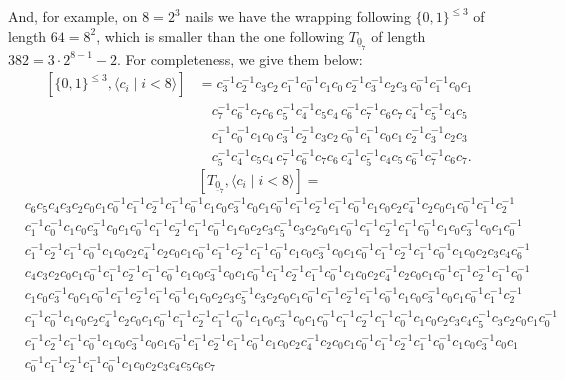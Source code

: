 \documentclass[11pt, a4paper, oneside]{article}
\theoremstyle{remark}
\theoremstyle{lemma}
\begin{document}
And, for example, on \(8 = 2^3\) nails we have the wrapping following \(\{0,1\}^{\leq 3}\) of length \(64 = 8^2\), which is smaller than the one following \(T_{\underline{0}_{7}}\) of length \( 382 = 3 \cdot 2^{8-1} - 2\). For completeness, we give them below:
\begin{align*}
\left[ \{0,1\}^{\leq 3}, \langle c_i \mid i < 8 \rangle \right] 
&= c_3^{-1}c_2^{-1}c_3c_2 \, c_1^{-1}c_0^{-1}c_1c_0 \, c_2^{-1}c_3^{-1}c_2c_3 \, c_0^{-1}c_1^{-1}c_0c_1 \, \\
&\quad
c_7^{-1}c_6^{-1}c_7c_6 \, c_5^{-1}c_4^{-1}c_5c_4 \, c_6^{-1}c_7^{-1}c_6c_7 \, c_4^{-1}c_5^{-1}c_4c_5 \, \\
&\quad c_1^{-1}c_0^{-1}c_1c_0 \, c_3^{-1}c_2^{-1}c_3c_2 \, c_0^{-1}c_1^{-1}c_0c_1 \, c_2^{-1}c_3^{-1}c_2c_3 \, \\
&\quad c_5^{-1}c_4^{-1}c_5c_4 \, c_7^{-1}c_6^{-1}c_7c_6 \, c_4^{-1}c_5^{-1}c_4c_5 \, c_6^{-1}c_7^{-1}c_6c_7.
\end{align*}
\[
\left[ T_{\underline{0}_7}, \langle c_i \mid i < 8 \rangle \right] =
\]
\[
\begin{aligned}
&c_6 c_5 c_4 c_3 c_2 c_0 c_1 c_0^{-1} c_1^{-1} c_2^{-1} c_1^{-1} c_0^{-1} c_1 c_0 c_3^{-1} c_0 c_1 c_0^{-1} c_1^{-1} c_2^{-1} c_1^{-1} c_0^{-1} c_1 c_0 c_2 c_4^{-1} c_2 c_0 c_1 c_0^{-1} c_1^{-1} c_2^{-1}\\ 
& c_1^{-1} c_0^{-1} c_1 c_0 c_3^{-1} c_0 c_1 c_0^{-1} c_1^{-1} c_2^{-1} c_1^{-1} c_0^{-1} c_1 c_0 c_2 c_3 c_5^{-1} c_3 c_2 c_0 c_1 c_0^{-1} c_1^{-1} c_2^{-1} c_1^{-1} c_0^{-1} c_1 c_0 c_3^{-1} c_0 c_1 c_0^{-1}\\
&c_1^{-1} c_2^{-1} c_1^{-1} c_0^{-1} c_1 c_0 c_2 c_4^{-1} c_2 c_0 c_1 c_0^{-1} c_1^{-1} c_2^{-1} c_1^{-1} c_0^{-1} c_1 c_0 c_3^{-1} c_0 c_1 c_0^{-1} c_1^{-1} c_2^{-1} c_1^{-1} c_0^{-1} c_1 c_0 c_2 c_3 c_4 c_6^{-1}\\
&c_4 c_3 c_2 c_0 c_1 c_0^{-1} c_1^{-1} c_2^{-1} c_1^{-1} c_0^{-1}c_1 c_0 c_3^{-1} c_0 c_1 c_0^{-1} c_1^{-1} c_2^{-1} c_1^{-1} c_0^{-1} c_1 c_0 c_2 c_4^{-1} c_2 c_0 c_1 c_0^{-1} c_1^{-1} c_2^{-1} c_1^{-1} c_0^{-1}\\
&c_1 c_0 c_3^{-1} c_0 c_1 c_0^{-1} c_1^{-1} c_2^{-1} c_1^{-1} c_0^{-1} c_1 c_0 c_2 c_3 c_5^{-1} c_3 c_2 c_0 c_1 c_0^{-1} c_1^{-1} c_2^{-1} c_1^{-1} c_0^{-1} c_1 c_0 c_3^{-1} c_0 c_1 c_0^{-1}c_1^{-1} c_2^{-1}\\
&c_1^{-1} c_0^{-1} c_1 c_0 c_2 c_4^{-1} c_2 c_0 c_1 c_0^{-1} c_1^{-1} c_2^{-1} c_1^{-1} c_0^{-1} c_1 c_0c_3^{-1} c_0 c_1 c_0^{-1} c_1^{-1} c_2^{-1} c_1^{-1} c_0^{-1} c_1 c_0 c_2 c_3c_4 c_5^{-1} c_3 c_2 c_0c_1 c_0^{-1}\\
&c_1^{-1} c_2^{-1} c_1^{-1} c_0^{-1} c_1 c_0 c_3^{-1} c_0 c_1 c_0^{-1} c_1^{-1} c_2^{-1} c_1^{-1} c_0^{-1} c_1 c_0 c_2 c_4^{-1} c_2 c_0 c_1 c_0^{-1}c_1^{-1} c_2^{-1} c_1^{-1} c_0^{-1} c_1 c_0 c_3^{-1} c_0 c_1\\
&c_0^{-1}c_1^{-1} c_2^{-1} c_1^{-1} c_0^{-1} c_1 c_0 c_2 c_3 
c_4 c_5 c_6 c_7
\end{aligned}
\]
\end{document}
